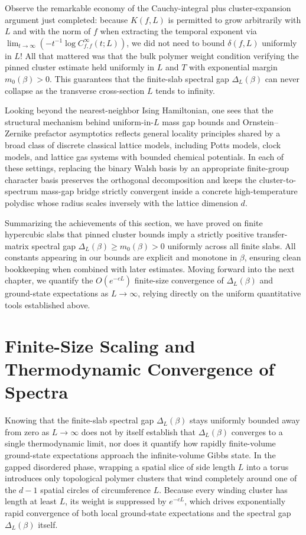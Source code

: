 \documentclass[11pt]{article}
\theoremstyle{definition}
\begin{document}
Observe the remarkable economy of the Cauchy-integral plus cluster-expansion
argument just completed: because $K(f, L)$ is permitted to grow arbitrarily with $L$
and with the norm of $f$ when extracting the temporal exponent via $\lim_{t \to
\infty} (-t^{-1} \log C_{f,f}^\infty(t; L))$, we did not need to bound $\delta(f,
L)$ uniformly in $L$! All that mattered was that the bulk polymer weight condition
verifying the pinned cluster estimate held uniformly in $L$ and $T$ with exponential
margin $m_0(\beta) > 0$. This guarantees that the finite-slab spectral gap
$\Delta_L(\beta)$ can never collapse as the transverse cross-section $L$ tends to
infinity.

Looking beyond the nearest-neighbor Ising Hamiltonian, one sees that the structural
mechanism behind uniform-in-$L$ mass gap bounds and Ornstein--Zernike prefactor
asymptotics reflects general locality principles shared by a broad class of discrete
classical lattice models, including Potts models, clock models, and lattice gas
systems with bounded chemical potentials. In each of these settings, replacing the
binary Walsh basis by an appropriate finite-group character basis preserves the
orthogonal decomposition and keeps the cluster-to-spectrum mass-gap bridge strictly
convergent inside a concrete high-temperature polydisc whose radius scales inversely
with the lattice dimension $d$.

Summarizing the achievements of this section, we have proved on finite hypercubic
slabs that pinned cluster bounds imply a strictly positive transfer-matrix spectral
gap $\Delta_L(\beta) \ge m_0(\beta) > 0$ uniformly across all finite slabs. All
constants appearing in our bounds are explicit and monotone in $\beta$, ensuring
clean bookkeeping when combined with later estimates. Moving forward into the next
chapter, we quantify the $O(e^{-c L})$ finite-size convergence of $\Delta_L(\beta)$
and ground-state expectations as $L \to \infty$, relying directly on the uniform
quantitative tools established above.

\section{Finite-Size Scaling and Thermodynamic Convergence of Spectra}
\label{sec:s09}

Knowing that the finite-slab spectral gap $\Delta_L(\beta)$ stays uniformly bounded
away from zero as $L \to \infty$ does not by itself establish that $\Delta_L(\beta)$
converges to a single thermodynamic limit, nor does it quantify how rapidly
finite-volume ground-state expectations approach the infinite-volume Gibbs state. In
the gapped disordered phase, wrapping a spatial slice of side length $L$ into a
torus introduces only topological polymer clusters that wind completely around one
of the $d - 1$ spatial circles of circumference $L$. Because every winding cluster
has length at least $L$, its weight is suppressed by $e^{-c L}$, which drives
exponentially rapid convergence of both local ground-state expectations and the
spectral gap $\Delta_L(\beta)$ itself.
\end{document}
